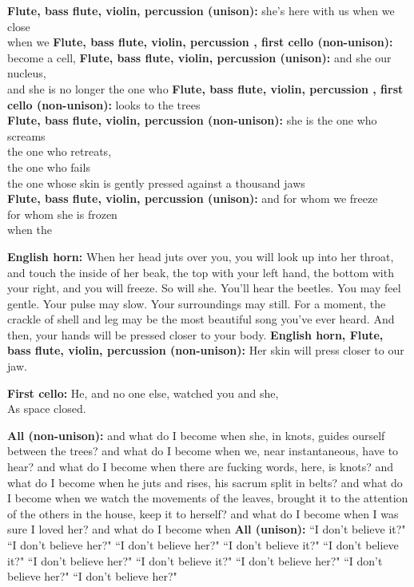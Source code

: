 \documentclass[11pt]{article}
\begin{document}
\begingroup
\textbf{Flute, bass flute, violin, percussion (unison):} she's here with us when we close \\ when we \textbf{Flute, bass flute, violin, percussion , first cello (non-unison):} become a cell, \textbf{Flute, bass flute, violin, percussion (unison):} and she our nucleus, \\ and she is no longer the one who \textbf{Flute, bass flute, violin, percussion , first cello (non-unison):}  looks to the trees \\ \textbf{Flute, bass flute, violin, percussion (non-unison):} she is the one who screams \\ the one who retreats, \\ the one who fails \\ the one whose skin is gently pressed against a thousand jaws \\ \textbf{Flute, bass flute, violin, percussion (unison):} and for whom we freeze \\ for whom she is frozen \\ when the
\endgroup

\begingroup
\textbf{English horn:} When her head juts over you, you will look up into her throat, and touch the inside of her beak, the top with your left hand, the bottom with your right, and you will freeze. So will she. You'll hear the beetles. You may feel gentle. Your pulse may slow. Your surroundings may still. For a moment, the crackle of shell and leg may be the most beautiful song you've ever heard. And then, your hands will be pressed closer to your body. \textbf{English horn, Flute, bass flute, violin, percussion (non-unison):} Her skin will press closer to our jaw.
\endgroup

\begingroup
\textbf{First cello:} He, and no one else, watched you and she, \\ As space closed.
\endgroup

\begingroup
\textbf{All (non-unison):} and what do I become when she, in knots, guides ourself between the trees? and what do I become when we, near instantaneous, have to hear? and what do I become when there are fucking words, here, is knots? and what do I become when he juts and rises, his sacrum split in belts? and what do I become when we watch the movements of the leaves, brought it to the attention of the others in the house, keep it to herself? and what do I become when I was sure I loved her? and what do I become when \textbf{All (unison):} ``I don't believe it?" ``I don't believe her?" ``I don't believe her?" ``I don't believe it?" ``I don't believe it?" ``I don't believe her?" ``I don't believe it?" ``I don't believe her?" ``I don't believe her?" ``I don't believe her?"
\endgroup
\end{document}
